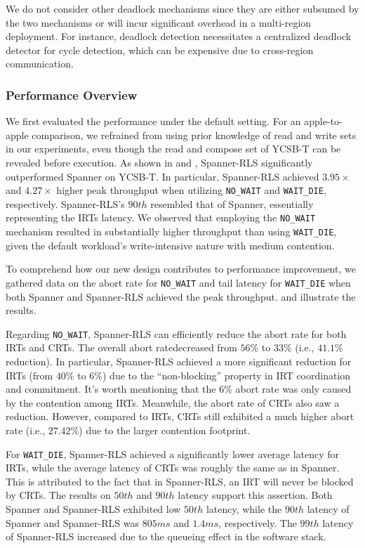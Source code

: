 We do not consider other deadlock mechanisms since they are either subsumed by the two mechanisms or will incur significant overhead in a multi-region deployment. 
For instance, deadlock detection necessitates a centralized deadlock detector for cycle detection, which can be expensive due to cross-region communication.

\subsubsection{Performance Overview} 

We first evaluated the performance under the default setting. For an apple-to-apple comparison, we refrained from using prior knowledge of read and write sets in our experiments, even though the read and compose set of YCSB-T can be revealed before execution. As shown in   and , Spanner-RLS significantly outperformed Spanner on YCSB-T. In particular, Spanner-RLS achieved $3.95\times$ and $4.27\times$ higher peak throughput when utilizing \texttt{NO\_WAIT} and \texttt{WAIT\_DIE}, respectively. Spanner-RLS's $90th$ resembled that of Spanner, essentially representing the IRTs latency. We observed that employing the \texttt{NO\_WAIT} mechanism resulted in substantially higher throughput than using \texttt{WAIT\_DIE}, given the default workload's write-intensive nature with medium contention.

To comprehend how our new design contributes to performance improvement, we gathered data on the abort rate for \texttt{NO\_WAIT} and tail latency for \texttt{WAIT\_DIE} when both Spanner and Spanner-RLS achieved the peak throughput.  and  illustrate the results. 

Regarding \texttt{NO\_WAIT}, Spanner-RLS can efficiently reduce the abort rate for both IRTs and CRTs. The overall abort ratedecreased from $56\%$ to $33\%$ (i.e., $41.1\%$ reduction). In particular, Spanner-RLS achieved a  more significant reduction for IRTs (from $40\%$ to $6\%$) due to the ``non-blocking'' property in IRT coordination and commitment. It's worth mentioning that the $6\%$ abort rate was only caused by the contention among IRTs. Meanwhile, the abort rate of CRTs also saw a reduction. However, compared to IRTs, CRTs still exhibited a much higher abort rate (i.e., $27.42\%$) due to the larger contention footprint.

For \texttt{WAIT\_DIE}, Spanner-RLS achieved a significantly lower average latency for IRTs, while the average latency of CRTs was roughly the same as in Spanner. This is attributed to the fact that in Spanner-RLS, an IRT will never be blocked by CRTs. The results on $50th$ and $90th$ latency support this assertion. Both Spanner and Spanner-RLS exhibited low $50th$ latency, while the $90th$ latency of Spanner and Spanner-RLS was $805ms$ and $1.4ms$, respectively. The $99th$ latency of Spanner-RLS increased due to the queueing effect in the software stack. 

